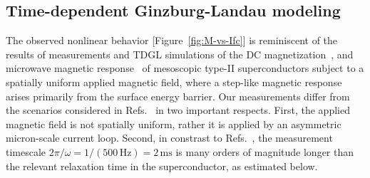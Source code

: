 \documentclass[%
 reprint,
 superscriptaddress,
 amsmath,
 amssymb,
 amsfonts,
 aps,
 prb,
]{revtex4-2}
\newcommand{\FC}{\mathrm{FC}}
\newcommand{\pk}{\mathrm{pk}}
\begin{document}

\subsection{Time-dependent Ginzburg-Landau modeling}
\label{sec:modeling}

The observed nonlinear behavior [Figure~\ref{fig:M-vs-Ifc}] is reminiscent of the results of measurements and TDGL simulations of the DC magnetization~\cite{Kanda2004-lx, Hernandez2002-nx}, and microwave magnetic response~\cite{Hernandez2002-oe, Hernandez2008-mi} of mesoscopic type-II superconductors subject to a spatially uniform applied magnetic field, where a step-like magnetic response arises primarily from the surface energy barrier. Our measurements differ from the scenarios considered in Refs.~\cite{Kanda2004-lx, Hernandez2002-nx, Hernandez2002-oe, Hernandez2008-mi} in two important respects. First, the applied magnetic field is not spatially uniform, rather it is applied by an asymmetric micron-scale current loop. Second, in constrast to Refs.~\cite{Hernandez2002-oe, Hernandez2008-mi}, the measurement timescale $2\pi/\omega=1/(500\,\mathrm{Hz})=2\,\mathrm{ms}$ is many orders of magnitude longer than the relevant relaxation time in the superconductor, as estimated below.
\end{document}
